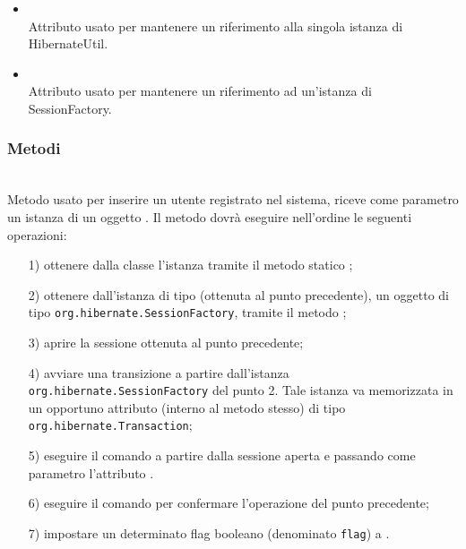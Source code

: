 \begin{itemize}
	\item{}\\
	Attributo usato per mantenere un riferimento alla singola istanza di HibernateUtil.
	\item{}\\
	Attributo usato per mantenere un riferimento ad un'istanza di SessionFactory.
\end{itemize}

\subsubsection*{Metodi}

\begin{description}

	\item{}\\
	Metodo usato per inserire un utente registrato nel sistema, riceve come parametro un istanza di un oggetto . Il metodo dovrà eseguire nell'ordine le seguenti operazioni:
		\begin{itemize}
			\item[1)] ottenere dalla classe  l'istanza tramite il metodo statico ;
			\item[2)] ottenere dall'istanza di tipo  (ottenuta al punto precedente), un oggetto di tipo \texttt{org.hibernate.SessionFactory}, tramite il metodo ;
			\item[3)] aprire la sessione ottenuta al punto precedente;
			\item[4)] avviare una transizione a partire dall'istanza \texttt{org.hibernate.SessionFactory} del punto 2. Tale istanza va memorizzata in un opportuno attributo (interno al metodo stesso) di tipo \texttt{org.hibernate.Transaction};
			\item[5)] eseguire il comando  a partire dalla sessione aperta e passando come parametro l'attributo .
			\item[6)] eseguire il comando  per confermare l'operazione del punto precedente;
			\item[7)] impostare un determinato flag booleano (denominato \texttt{flag}) a .
		\end{itemize}
		

\end{description}
